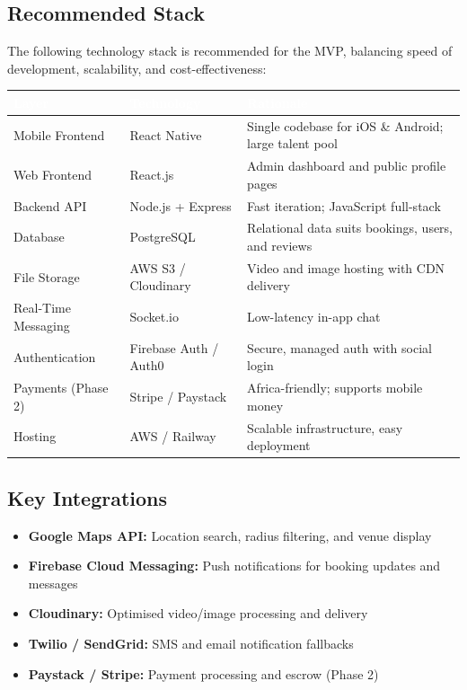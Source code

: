 \documentclass[11pt,a4paper]{article}
\begin{document}
\subsection{Recommended Stack}

The following technology stack is recommended for the MVP, balancing speed of
development, scalability, and cost-effectiveness:

\vspace{0.5em}
\begin{tabularx}{\textwidth}{@{} L{3cm} L{3.5cm} X @{}}
  \toprule
  \textcolor{white}{\textbf{Layer}} &
  \textcolor{white}{\textbf{Technology}} &
  \textcolor{white}{\textbf{Rationale}} \\
  \midrule
  Mobile Frontend   & React Native        & Single codebase for iOS \& Android; large talent pool \\
  Web Frontend      & React.js            & Admin dashboard and public profile pages \\
  Backend API       & Node.js + Express   & Fast iteration; JavaScript full-stack \\
  Database          & PostgreSQL          & Relational data suits bookings, users, and reviews \\
  File Storage      & AWS S3 / Cloudinary & Video and image hosting with CDN delivery \\
  Real-Time Messaging & Socket.io         & Low-latency in-app chat \\
  Authentication    & Firebase Auth / Auth0 & Secure, managed auth with social login \\
  Payments (Phase 2) & Stripe / Paystack  & Africa-friendly; supports mobile money \\
  Hosting           & AWS / Railway       & Scalable infrastructure, easy deployment \\
  \bottomrule
\end{tabularx}
\vspace{0.5em}

\subsection{Key Integrations}
\begin{itemize}[leftmargin=1.5em]
  \item \textbf{Google Maps API:} Location search, radius filtering, and venue
        display
  \item \textbf{Firebase Cloud Messaging:} Push notifications for booking
        updates and messages
  \item \textbf{Cloudinary:} Optimised video/image processing and delivery
  \item \textbf{Twilio / SendGrid:} SMS and email notification fallbacks
  \item \textbf{Paystack / Stripe:} Payment processing and escrow (Phase 2)
\end{itemize}
\end{document}
